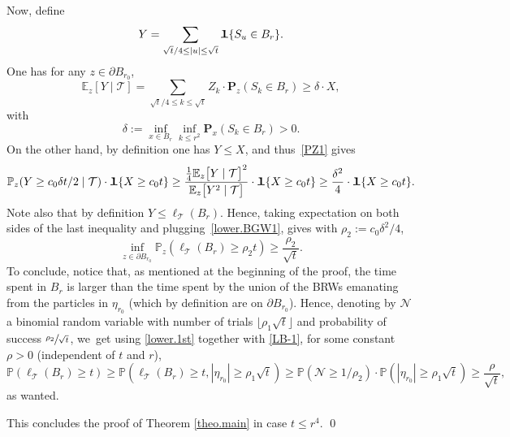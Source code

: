 \documentclass[JEP,XML,SOM,Unicode,NoFloatCountersInSection,published]{cedram}
\theoremstyle{plain}
\theoremstyle{definition}
\newcommand{\1}{{\text{\Large $\mathfrak 1$}}}
\begin{document}
Now, define
\begin{equation*}%
Y= \sum_{\sqrt t/4\le |u|\le \sqrt t} \1\{S_u \in B_r\}.
\end{equation*}
One has for any $z\in \partial B_{r_0}$,
\[
\mathbb E_z[Y\mid \mathbf {\mathcal T}] =
\sum_{\sqrt t/4\le k\le\sqrt t} Z_k \cdot \mathbf P_z(S_k \in B_r)
\ge \delta\cdot X,
\]
with
\begin{equation*}
\delta:=\inf_{x\in B_r}\inf_{k\le r^2} \mathbf P_x(S_k\in B_r)>0.
\end{equation*}
On the other hand, by definition one has
$Y \le X$, and thus~\eqref{PZ1}
gives
\[
\mathbb P_z(Y \ge c_0\delta t/2 \mid \mathbf {\mathcal T})
\cdot \1\{X\ge c_0t\}
\ge \frac{\frac{1}{4}\mathbb E_z\big[ Y\mid \mathbf {\mathcal T}\big]^2}
{\mathbb E_z\big[Y^2\mid \mathbf {\mathcal T}\big]}\cdot \1\{X\ge c_0t \}
\ge \frac{\delta^2}{4}\cdot \1\{X\ge c_0t\}.
\]
Note also that by definition $Y\le \ell_{\mathcal T}(B_r)$. Hence, taking expectation on
both sides of the last inequality and plugging~\eqref{lower.BGW1}, gives with $\rho_2:= c_0\delta^2/4$,
\begin{equation}\label{LB-1}
\inf_{z\in \partial B_{r_0}} \mathbb P_z(\ell_{\mathcal T}(B_r)\ge \rho_2 t) \ge \frac{\rho_2}{\sqrt t}.
\end{equation}
To conclude, notice that, as mentioned at the beginning of the proof, the time spent in $B_r$ is larger than the time spent by
the union of the BRWs emanating from the particles in $\eta_{r_0}$ (which by definition are on $\partial B_{r_0}$).
Hence, denoting by $\mathcal N$ a binomial random variable with number of trials $\lfloor \rho_1\sqrt t\rfloor $ and probability of success $\sfrac{\rho_2}{\sqrt t}$, we~get using \eqref{lower.1st} together with \eqref{LB-1},
for some constant $\rho>0$ (independent of $t$ and $r$),
\[
\mathbb P(\ell_{\mathcal T}(B_r) \ge t) \ge\mathbb P(\ell_{\mathcal T}(B_r) \ge t, |\eta_{r_0}|\ge \rho_1\sqrt t) \ge \mathbb P(\mathcal N\ge 1/\rho_2)\cdot \mathbb P(|\eta_{r_0}|\ge \rho_1\sqrt t) \ge \frac{\rho}{\sqrt t},
\]
as wanted.

This concludes the proof of Theorem \ref{theo.main} in case $t\le r^4$. \qed
\end{document}
